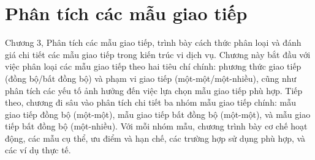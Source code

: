 \chapter{Phân tích các mẫu giao tiếp}

Chương 3, Phân tích các mẫu giao tiếp, trình bày cách thức phân loại và đánh giá chi tiết các mẫu giao tiếp trong kiến trúc vi dịch vụ. Chương này bắt đầu với việc phân loại các mẫu giao tiếp theo hai tiêu chí chính: phương thức giao tiếp (đồng bộ/bất đồng bộ) và phạm vi giao tiếp (một-một/một-nhiều), cũng như phân tích các yếu tố ảnh hưởng đến việc lựa chọn mẫu giao tiếp phù hợp. Tiếp theo, chương đi sâu vào phân tích chi tiết ba nhóm mẫu giao tiếp chính: mẫu giao tiếp đồng bộ (một-một), mẫu giao tiếp bất đồng bộ (một-một), và mẫu giao tiếp bất đồng bộ (một-nhiều). Với mỗi nhóm mẫu, chương trình bày cơ chế hoạt động, các mẫu cụ thể, ưu điểm và hạn chế, các trường hợp sử dụng phù hợp, và các ví dụ thực tế.




